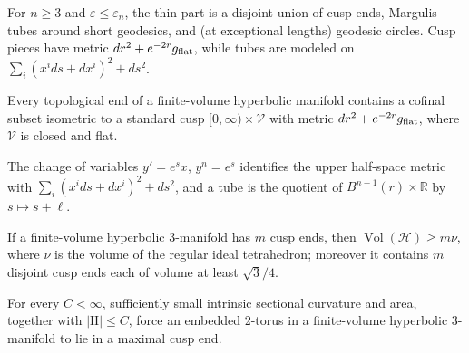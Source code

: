 \begin{theorem}
\label{thm:chow-iv-thin-part-structure}

For \(n\ge3\) and \(\varepsilon\le\varepsilon_n\), the thin part is a disjoint
union of cusp ends, Margulis tubes around short geodesics, and (at exceptional
lengths) geodesic circles.  Cusp pieces have metric
\(dr^2+e^{-2r}g_{\rm flat}\), while tubes are modeled on
\(\sum_i(x^i ds+dx^i)^2+ds^2\).
\end{theorem}

\begin{theorem}
\label{thm:chow-iv-finite-volume-ends-cusps}


Every topological end of a finite-volume hyperbolic manifold contains a
cofinal subset isometric to a standard cusp
\([0,\infty)\times\mathcal V\) with metric
\(dr^2+e^{-2r}g_{\rm flat}\), where \(\mathcal V\) is closed and flat.
\end{theorem}

\begin{example}
\label{ex:chow-iv-margulis-tube-quotient}

The change of variables \(y'=e^s x\), \(y^n=e^s\) identifies the upper
half-space metric with \(\sum_i(x^i ds+dx^i)^2+ds^2\), and a tube is the quotient
of \(B^{n-1}(r)\times\mathbb R\) by \(s\mapsto s+\ell\).
\end{example}

\begin{theorem}
\label{thm:chow-iv-cusp-volume-bound}

If a finite-volume hyperbolic 3-manifold has \(m\) cusp ends, then
\(\operatorname{Vol}(\mathcal H)\ge m\nu\), where \(\nu\) is the volume of the
regular ideal tetrahedron; moreover it contains \(m\) disjoint cusp ends each
of volume at least \(\sqrt3/4\).
\end{theorem}

\begin{corollary}
\label{cor:chow-iv-small-almost-flat-tori}


For every \(C<\infty\), sufficiently small intrinsic sectional curvature and
area, together with \(|\mathrm{II}|\le C\), force an embedded 2-torus in a
finite-volume hyperbolic 3-manifold to lie in a maximal cusp end.
\end{corollary}

